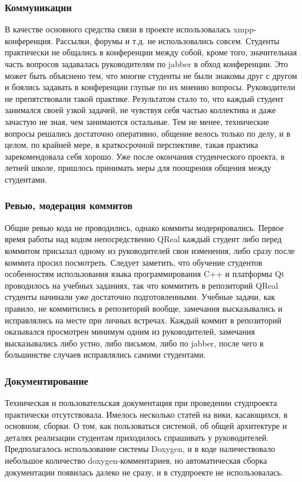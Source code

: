 \documentclass[a5paper]{article}
\begin{document}
\subsubsection{Коммуникации}
В качестве основного средства связи в проекте использовалась xmpp-конференция. Рассылки, форумы и т.д. не использовались совсем. Студенты практически не общались в конференции между собой, кроме того, значительная часть вопросов задавалась руководителям по jabber в обход конференции. Это может быть объяснено тем, что многие студенты не были знакомы друг с другом и боялись задавать в конференции глупые по их мнению вопросы. Руководители не препятствовали такой практике. Результатом стало то, что каждый студент занимался своей узкой задачей, не чувствуя себя частью коллектива и даже зачастую не зная, чем занимаются остальные. Тем не менее, технические вопросы решались достаточно оперативно, общение велось только по делу, и в целом, по крайней мере, в краткосрочной перспективе, такая практика зарекомендовала себя хорошо. Уже после окончания студенческого проекта, в летней школе, пришлось принимать меры для поощрения общения между студентами.

\subsubsection{Ревью, модерация коммитов}
Общие ревью кода не проводились, однако коммиты модерировались. Первое время работы над кодом непосредственно QReal каждый студент либо перед коммитом присылал одному из руководителей свои изменения, либо сразу после коммита просил посмотреть. Следует заметить, что обучение студентов особенностям использования языка программирования C++ и платформы Qt проводилось на учебных заданиях, так что коммитить в репозиторий QReal студенты начинали уже достаточно подготовленными. Учебные задачи, как правило, не коммитились в репозиторий вообще, замечания высказывались и исправлялись на месте при личных встречах. Каждый коммит в репозиторий оказывался просмотрен минимум одним из руководителей, замечания высказывались либо устно, либо письмом, либо по jabber, после чего в большинстве случаев исправлялись самими студентами.

\subsubsection{Документирование}
Техническая и пользовательская документация при проведении студпроекта практически отсутствовала. Имелось несколько статей на вики, касающихся, в основном, сборки. О том, как пользоваться системой, об общей архитектуре и деталях реализации студентам приходилось спрашивать у руководителей. Предполагалось использование системы Doxygen, и в коде наличествовало небольшое количество doxygen-комментариев, но автоматическая сборка документации появилась далеко не сразу, и в студпроекте не использовалась.
\end{document}
